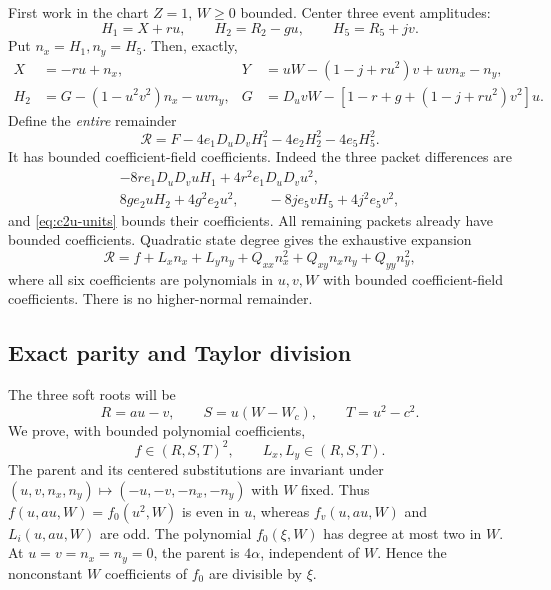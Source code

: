 First work in the chart $Z=1$, $W\ge0$ bounded. Center three event amplitudes:
\[
 H_1=X+ru,\qquad H_2=R_2-gu,\qquad H_5=R_5+jv.
\]
Put $n_x=H_1,n_y=H_5$. Then, exactly,
\begin{align}
X&=-ru+n_x,&
Y&=uW-(1-j+ru^2)v+uvn_x-n_y,\label{eq:c2u-normal-sub}\\
H_2&=G-(1-u^2v^2)n_x-uvn_y,&
G&=D_uvW-[1-r+g+(1-j+ru^2)v^2]u.\label{eq:c2u-current}
\end{align}
Define the \emph{entire} remainder
\begin{equation}
\mathcal R=F-4e_1D_uD_vH_1^2-4e_2H_2^2-4e_5H_5^2.
\label{eq:c2u-remainder}
\end{equation}
It has bounded coefficient-field coefficients. Indeed the three packet
differences are
\begin{gather*}
-8re_1D_uD_vuH_1+4r^2e_1D_uD_vu^2,\\
8ge_2uH_2+4g^2e_2u^2,\qquad
-8je_5vH_5+4j^2e_5v^2,
\end{gather*}
and \eqref{eq:c2u-units} bounds their coefficients. All remaining
packets already have bounded coefficients. Quadratic state degree gives
the exhaustive expansion
\begin{equation}
\mathcal R=f+L_xn_x+L_yn_y
 +Q_{xx}n_x^2+Q_{xy}n_xn_y+Q_{yy}n_y^2,
\label{eq:c2u-normal-expansion}
\end{equation}
where all six coefficients are polynomials in $u,v,W$ with bounded
coefficient-field coefficients. There is no higher-normal remainder.

\subsection{Exact parity and Taylor division}
The three soft roots will be
\begin{equation}
 R=au-v,\qquad S=u(W-W_c),\qquad T=u^2-c^2.
\label{eq:c2u-soft}
\end{equation}
We prove, with bounded polynomial coefficients,
\begin{equation}
 f\in(R,S,T)^2,\qquad L_x,L_y\in(R,S,T).
\label{eq:c2u-membership}
\end{equation}
The parent and its centered substitutions are invariant under
$(u,v,n_x,n_y)\mapsto(-u,-v,-n_x,-n_y)$ with $W$ fixed.
Thus $f(u,au,W)=f_0(u^2,W)$ is even in $u$, whereas
$f_v(u,au,W)$ and $L_i(u,au,W)$ are odd. The polynomial $f_0(\xi,W)$
has degree at most two in $W$. At $u=v=n_x=n_y=0$, the parent is
$4\alpha$, independent of $W$. Hence the nonconstant $W$ coefficients
of $f_0$ are divisible by $\xi$.

